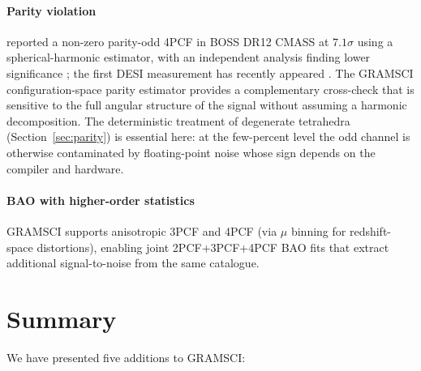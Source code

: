 \documentclass[twocolumn]{aastex701}
\begin{document}
\paragraph{Parity violation}
\citet{hou23} reported a non-zero parity-odd 4PCF in BOSS DR12 CMASS at
$7.1\sigma$ using a spherical-harmonic estimator, with an independent
analysis finding lower significance \citep{philcox22parity}; the first
DESI measurement has recently appeared \citep{slepian25}.  The GRAMSCI configuration-space parity
estimator provides a complementary cross-check that is sensitive to the
full angular structure of the signal without assuming a harmonic
decomposition.  The deterministic treatment of degenerate tetrahedra
(Section~\ref{sec:parity}) is essential here: at the few-percent level the
odd channel is otherwise contaminated by floating-point noise whose sign
depends on the compiler and hardware.

\paragraph{BAO with higher-order statistics}
GRAMSCI supports anisotropic 3PCF and 4PCF (via $\mu$ binning for
redshift-space distortions), enabling joint 2PCF+3PCF+4PCF BAO fits that
extract additional signal-to-noise from the same catalogue.

\section{Summary}
\label{sec:summary}

We have presented five additions to GRAMSCI:
\end{document}
